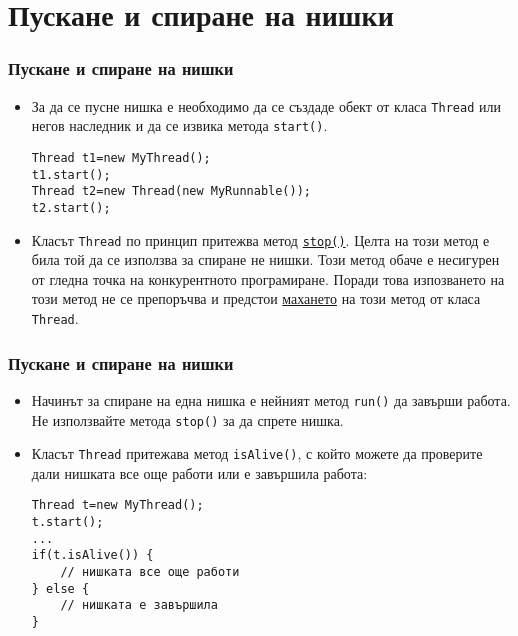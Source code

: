 \documentclass[ignorenonframetext, hyperref=unicode,compress]{beamer}
\begin{document}
\section{Пускане и спиране на нишки}
\begin{frame}[containsverbatim]
\frametitle{Пускане и спиране на нишки}
\begin{itemize}
\item За да се пусне нишка е необходимо да се създаде обект от класа
\lstinline{Thread} или негов наследник и да се извика метода
\lstinline{start()}.
\begin{lstlisting}
Thread t1=new MyThread();
t1.start();
Thread t2=new Thread(new MyRunnable());
t2.start();
\end{lstlisting}
\item Класът \lstinline{Thread} по принцип притежва метод
\href{http://java.sun.com/javase/6/docs/api/java/lang/Thread.html#stop()}{\lstinline{stop()}}.
Целта на този метод е била той да се използва за спиране не нишки. Този метод
обаче е несигурен от гледна точка на конкурентното програмиране. Поради това
изпозването на този метод не се препоръчва и предстои 
\href{http://java.sun.com/javase/6/docs/technotes/guides/concurrency/threadPrimitiveDeprecation.html}{махането}
на този метод от класа \lstinline{Thread}.
\end{itemize}
\end{frame}

\begin{frame}[containsverbatim]
\frametitle{Пускане и спиране на нишки}
\begin{itemize}
\item Начинът за спиране на една нишка е нейният метод \lstinline{run()} да
завърши работа. Не използвайте метода \lstinline{stop()} за да спрете нишка.
\item Класът \lstinline{Thread} притежава метод \lstinline{isAlive()}, с който
можете да проверите дали нишката все още работи или е завършила работа:
\begin{lstlisting}
Thread t=new MyThread();
t.start();
...
if(t.isAlive()) {
	// нишката все още работи
} else {
	// нишката е завършила
}
\end{lstlisting}
\end{itemize}
\end{frame}
\end{document}
